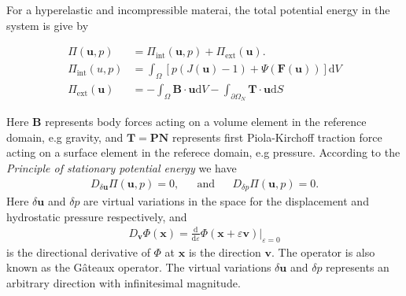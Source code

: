 For a hyperelastic and incompressible materai, the total potential
energy in the system is give by


\begin{align}
  \Pi(\mathbf{u}, p) &= \Pi_{\mathrm{int}}(\mathbf{u},p) + \Pi_{\mathrm{ext}}(\mathbf{u}). \\
  \Pi_{\mathrm{int}}(u,p) &= \int_{\Omega} \left[ p(J(\mathbf{u}) - 1) +  \Psi(\mathbf{F}(\mathbf{u})) \right] \mathrm{d}V\\
  \Pi_{\mathrm{ext}}(\mathbf{u}) &= - \int_{\Omega} \mathbf{B} \cdot \mathbf{u} \mathrm{d} V - \int_{\partial \Omega_N} \mathbf{T} \cdot \mathbf{u} \mathrm{d}S
\end{align}

Here $\mathbf{B}$ represents body forces acting on a volume element in the reference domain,
e.g  gravity, and $\mathbf{T} = \mathbf{P} \mathbf{N}$ represents
first Piola-Kirchoff traction force acting on a surface element in the
referece domain, e.g pressure.
According to the \emph{Principle of stationary potential energy} we
have 
\begin{align}
  D_{\delta \mathbf{u}} \Pi(\mathbf{u}, p) = 0,  && \text{and} && D_{\delta p} \Pi(\mathbf{u}, p) = 0.
  \label{eq:minimum_potential_energy}
\end{align}
Here $\delta \mathbf{u}$ and $\delta p$ are virtual variations in the
space for the displacement and hydrostatic pressure respectively, and
\begin{align}
  D_{\mathbf{v}} \Phi(\mathbf{x}) = \frac{\mathrm{d}}{\mathrm{d}\varepsilon} \Phi(\mathbf{x} + \varepsilon \mathbf{v})\big|_{\varepsilon = 0}
\end{align}
is the directional derivative of $\Phi$ at $\mathbf{x}$ is the
direction $\mathbf{v}$. The operator is also known as the G\^ateaux
operator. The virtual variations $\delta \mathbf{u}$ and $\delta p$
represents an arbitrary direction with infinitesimal magnitude.


